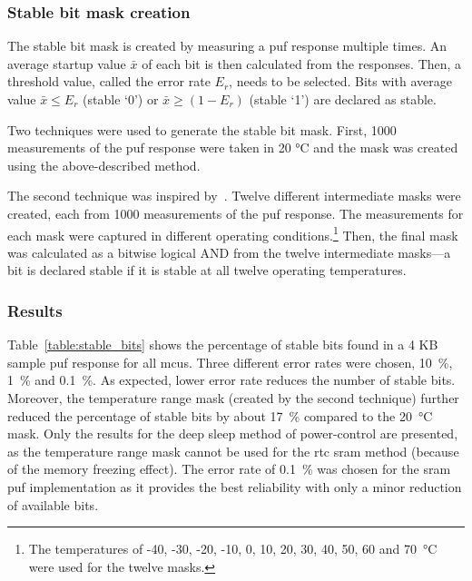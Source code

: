 \subsubsection*{Stable bit mask creation}

The stable bit mask is created by measuring a \gls{puf} response multiple times. An average startup value $\bar{x}$ of each bit is then calculated from the responses. Then, a threshold value, called the error rate $E_r$, needs to be selected. Bits with average value $\bar{x} \leq E_r$ (stable `0') or $\bar{x} \geq (1-E_r)$ (stable `1') are declared as stable.

Two techniques were used to generate the stable bit mask. First, 1000 measurements of the \gls{puf} response were taken in 20 °C and the mask was created using the above-described method.

The second technique was inspired by~\cite{Hanova2020}. Twelve different intermediate masks were created, each from 1000 measurements of the \gls{puf} response. The measurements for each mask were captured in different operating conditions.\footnote{The temperatures of -40, -30, -20, -10, 0, 10, 20, 30, 40, 50, 60 and 70~°C were used for the twelve masks.} Then, the final mask was calculated as a bitwise logical AND from the twelve intermediate masks---a bit is declared stable if it is stable at all twelve operating temperatures.

\subsubsection*{Results}

Table~\ref{table:stable_bits} shows the percentage of stable bits found in a 4 KB sample \gls{puf} response for all \glspl{mcu}. Three different error rates were chosen, 10~\%, 1~\% and 0.1~\%. As expected, lower error rate reduces the number of stable bits. Moreover, the temperature range mask (created by the second technique) further reduced the percentage of stable bits by about 17~\% compared to the 20~°C mask. Only the results for the deep sleep method of power-control are presented, as the temperature range mask cannot be used for the \gls{rtc} \gls{sram} method (because of the memory freezing effect). The error rate of 0.1~\% was chosen for the \gls{sram} \gls{puf} implementation as it provides the best reliability with only a minor reduction of available bits.


